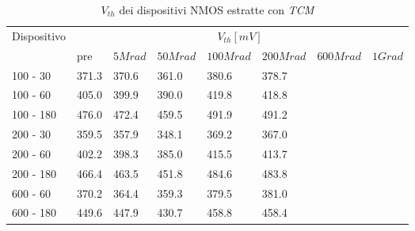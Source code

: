 \documentclass[12pt, letterpaper]{book}
\begin{document}
\begin{table}[H]
  \renewcommand{\arraystretch}{1.3}
  \begin{tabular}{m{2cm} m{0.8cm} m{1.1cm} m{1.3cm} m{1.5cm} m{1.5cm} m{1.5cm} m{1cm}}
    \toprule
    \multirow{2}{*}{Dispositivo} & \multicolumn{7}{c}{$V_{th} [mV] $}                                                                    \\
    \cmidrule{2-8}
                                 & pre                                & $5Mrad$ & $50Mrad$ & $100Mrad$ & $200Mrad$ & $600Mrad$ & $1Grad$ \\
    \midrule
    100 - 30                     & 371.3                              & 370.6   & 361.0    & 380.6     & 378.7     &           &         \\
    \hline
    100 - 60                     & 405.0                              & 399.9   & 390.0    & 419.8     & 418.8     &           &         \\
    \hline
    100 - 180                    & 476.0                              & 472.4   & 459.5    & 491.9     & 491.2     &           &         \\
    \hline
    200 - 30                     & 359.5                              & 357.9   & 348.1    & 369.2     & 367.0     &           &         \\
    \hline
    200 - 60                     & 402.2                              & 398.3   & 385.0    & 415.5     & 413.7     &           &         \\
    \hline
    200 - 180                    & 466.4                              & 463.5   & 451.8    & 484.6     & 483.8     &           &         \\
    \hline
    600 - 60                     & 370.2                              & 364.4   & 359.3    & 379.5     & 381.0     &           &         \\
    \hline
    600 - 180                    & 449.6                              & 447.9   & 430.7    & 458.8     & 458.4     &           &         \\
    \bottomrule
  \end{tabular}
  \caption{$V_{th}$ dei dispositivi NMOS estratte con \emph{TCM}}
  \label{tab:VthTCMN}
\end{table}
\end{document}

